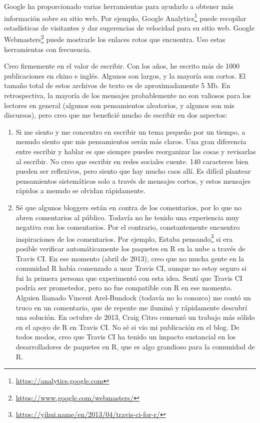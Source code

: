 \documentclass[12pt,]{krantz}
\renewcommand{\href}[2]{#2\footnote{\url{#1}}}
\theoremstyle{definition}
\theoremstyle{definition}
\theoremstyle{definition}
\theoremstyle{remark}
\begin{document}
Google ha proporcionado varias herramientas para ayudarlo a obtener más
información sobre su sitio web. Por ejemplo,
\href{https://analytics.google.com}{Google Analytics} puede recopilar
estadísticas de visitantes y dar sugerencias de velocidad para su sitio
web. \href{https://www.google.com/webmasters/}{Google Webmasters} puede
mostrarle los enlaces rotos que encuentra. Uso estas herramientas con
frecuencia.

Creo firmemente en el valor de escribir. Con los años, he escrito más de
1000 publicaciones en chino e inglés. Algunos son largos, y la mayoría
son cortos. El tamaño total de estos archivos de texto es de
aproximadamente 5 Mb. En retrospectiva, la mayoría de los mensajes
probablemente no son valiosos para los lectores en general (algunos son
pensamientos aleatorios, y algunos son mis discursos), pero creo que me
beneficié mucho de escribir en dos aspectos:

\begin{enumerate}
\def\labelenumi{\arabic{enumi}.}
\item
  Si me siento y me concentro en escribir un tema pequeño por un tiempo,
  a menudo siento que mis pensamientos serán más claros. Una gran
  diferencia entre escribir y hablar es que siempre puedes reorganizar
  las cosas y revisarlas al escribir. No creo que escribir en redes
  sociales cuente. 140 caracteres bien pueden ser reflexivos, pero
  siento que hay mucho caos allí. Es difícil plantear pensamientos
  sistemáticos solo a través de mensajes cortos, y estos mensajes
  rápidos a menudo se olvidan rápidamente.
\item
  Sé que algunos bloggers están en contra de los comentarios, por lo que
  no abren comentarios al público. Todavía no he tenido una experiencia
  muy negativa con los comentarios. Por el contrario, constantemente
  encuentro inspiraciones de los comentarios. Por ejemplo,
  \href{https://yihui.name/en/2013/04/travis-ci-for-r/}{Estaba pensando}
  si era posible verificar automáticamente los paquetes en R en la nube
  a través de Travis CI. En ese momento (abril de 2013), creo que no
  mucha gente en la comunidad R había comenzado a usar Travis CI, aunque
  no estoy seguro si fui la primera persona que experimentó con esta
  idea. Sentí que Travis CI podría ser prometedor, pero no fue
  compatible con R en ese momento. Alguien llamado Vincent Arel-Bundock
  (todavía no lo conozco) me contó un truco en un comentario, que de
  repente me iluminó y rápidamente descubrí una solución. En octubre de
  2013, Craig Citro comenzó un trabajo más sólido en el apoyo de R en
  Travis CI. No sé si vio mi publicación en el blog. De todos modos,
  creo que Travis CI ha tenido un impacto sustancial en los
  desarrolladores de paquetes en R, que es algo grandioso para la
  comunidad de R.
\end{enumerate}
\end{document}
